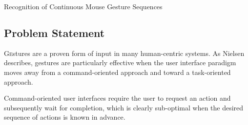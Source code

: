 \documentclass[twoside]{article}
\begin{document}
\centerline{Recognition of Continuous Mouse Gesture Sequences}
\normalsize


\begin{multicols}{2} %

\section{Problem Statement}

\lettrine[nindent=0em,lines=2]{G}estures are a proven form of input in many
human-centric systems. %
As Nielsen describes\cite{nielsen_noncommand_1993}, gestures are particularly
effective when the user interface paradigm moves away from a command-oriented
approach %
and toward a task-oriented approach.
\begin{comment}
In task-centric human-computer interaction scenarios, the user's aim is to request a sequence of
actions intended to complete a desired task. 
\end{comment}
Command-oriented user interfaces require the user to request an action 
and subsequently wait for completion, which is clearly sub-optimal when 
the desired sequence of actions is known in advance.


\end{multicols}
\end{document}
